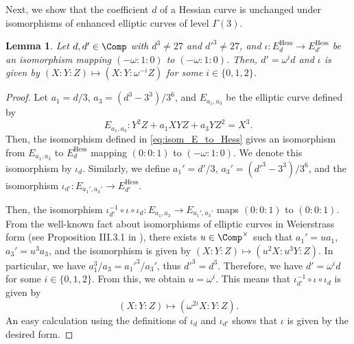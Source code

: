 \documentclass{amsart}
\newtheorem{lemma}[theorem]{Lemma}
\theoremstyle{definition}
\theoremstyle{remark}
\numberwithin{equation}{section}
\begin{document}
Next, we show that the coefficient $d$ of a Hessian curve
is unchanged under isomorphisms of enhanced elliptic curves of level $\Gamma(3)$.
\begin{lemma}\label{lem:isom_Hess_to_Hess_w}
    Let $d, d' \in \Comp$ with $d^3 \neq 27$ and $d'^3 \neq 27$,
    and $\iota : E_d^\mathrm{Hess} \to E_{d'}^\mathrm{Hess}$ be an isomorphism
    mapping $(-\omega:1:0)$ to $(-\omega:1:0)$.
    Then,
    $d' = \omega^i d$ and $\iota$ is given by
    $(X:Y:Z) \mapsto (X:Y: \omega^{-i} Z)$
    for some $i \in \{0, 1, 2\}$.
\end{lemma}
\begin{proof}
    Let $a_1 = d/3$, $a_3 = (d^3 - 3^3)/3^6$, and $E_{a_1, a_3}$
    be the elliptic curve defined by
    \begin{equation*}
        E_{a_1, a_3} : Y^2 Z + a_1 XYZ + a_3 Y Z^2 = X^3.
    \end{equation*}
    Then, the isomorphism defined in \eqref{eq:isom_E_to_Hess}
    gives an isomorphism from $E_{a_1, a_3}$ to $E_d^\mathrm{Hess}$
    mapping $(0:0:1)$ to $(-\omega:1:0)$.
    We denote this isomorphism by $\iota_d$.
    Similarly, we define $a_1' = d'/3$, $a_3' = (d'^3 - 3^3)/3^6$,
    and the isomorphism $\iota_{d'} : E_{a_1', a_3'} \to E_{d'}^\mathrm{Hess}$.

    Then, the isomorphism
    $\iota_{d'}^{-1} \circ \iota \circ \iota_d : E_{a_1, a_3} \to E_{a_1', a_3'}$
    maps $(0:0:1)$ to $(0:0:1)$.
    From the well-known fact about isomorphisms of elliptic curves in Weierstrass form
    (see Proposition III.3.1 in \cite{silverman2009arithmetic}),
    there exists $u \in \Comp^\times$ such that
    $a_1' = u a_1$, $a_3' = u^3 a_3$,
    and the isomorphism is given by $(X:Y:Z) \mapsto (u^2 X : u^3 Y : Z)$.
    In particular, we have $a_1^3/a_3 = a_1'^3/a_3'$,
    thus $d'^3 = d^3$.
    Therefore, we have $d' = \omega^i d$ for some $i \in \{0, 1, 2\}$.
    From this, we obtain $u = \omega^i$.
    This means that
    $\iota_{d'}^{-1} \circ \iota \circ \iota_d$ is given by
    \begin{equation*}
        (X:Y:Z) \mapsto (\omega^{2i} X : Y : Z).
    \end{equation*}
    An easy calculation using the definitions of $\iota_d$ and $\iota_{d'}$
    shows that
    $\iota$ is given by the desired form.
\end{proof}
\end{document}
